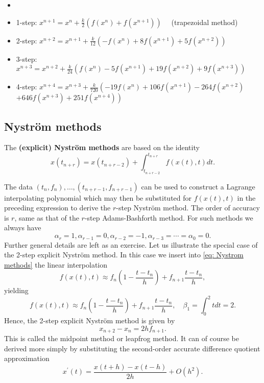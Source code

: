 \begin{example}
\label{eg: Implicit Adams-Moulton methods}
\begin{itemize}
    \item []
    \item 1-step: $ x^{n+1}=x^n+\frac{k}{2}\left(f\left(x^n\right)+f\left(x^{n+1}\right)\right) \quad$ (trapezoidal method)
    \item 2-step: $x^{n+2}=x^{n+1}+\frac{k}{12}\left(-f\left(x^n\right)+8 f\left(x^{n+1}\right)+5 f\left(x^{n+2}\right)\right)$
    \item 3-step: $x^{n+3}=x^{n+2}+\frac{k}{24}\left(f\left(x^n\right)-5 f\left(x^{n+1}\right)+19 f\left(x^{n+2}\right)+9 f\left(x^{n+3}\right)\right)$
    \item 4-step: $ x^{n+4}=x^{n+3}+\frac{k}{720}\left(-19 f\left(x^n\right)+106 f\left(x^{n+1}\right)-264 f\left(x^{n+2}\right)\right.$ $\left.+646 f\left(x^{n+3}\right)+251 f\left(x^{n+4}\right)\right)$
\end{itemize}
\end{example}


\subsection{Nystr\"om methods}
The \textbf{(explicit) Nyström methods} are based on the identity
\begin{equation}
\label{eq: Nystrom methods}
    x\left(t_{n+r}\right)=x\left(t_{n+r-2}\right)+\int_{t_{n+r-2}}^{t_{n+r}} f(x(t), t) d t .
\end{equation}

The data $\left(t_n, f_n\right), \ldots,\left(t_{n+r-1}, f_{n+r-1}\right)$ can be used to construct a Lagrange interpolating polynomial which may then be substituted for $f(x(t), t)$ in the preceding expression to derive the $r$-step Nystr\"om method. The order of accuracy is $r$, same as that of the $r$-step Adams-Bashforth method. For such methods we always have
$$
\alpha_r=1, \alpha_{r-1}=0, \alpha_{r-2}=-1, \alpha_{r-3}=\cdots=\alpha_0=0 .
$$
Further general details are left as an exercise.
Let us illustrate the special case of the 2-step explicit Nystr\"om method. In this case we insert into \eqref{eq: Nystrom methods} the linear interpolation
\[
    f(x(t), t) \approx f_n\left(1-\frac{t-t_n}{h}\right)+f_{n+1} \frac{t-t_n}{h},
\]
yielding 
\[
    f(x(t), t) \approx f_n\left(1-\frac{t-t_n}{h}\right)+f_{n+1} \frac{t-t_n}{h}, \quad \beta_1=\int_0^2 t d t=2 .
\]
Hence, the 2-step explicit Nystr\"om method is given by 
\[
    x_{n+2}-x_n=2 h f_{n+1}. 
\]
This is called the midpoint method or leapfrog method. It can of course be derived more simply by substituting the second-order accurate difference quotient approximation
$$
x^{\prime}(t)=\frac{x(t+h)-x(t-h)}{2 h}+O\left(h^2\right). 
$$

